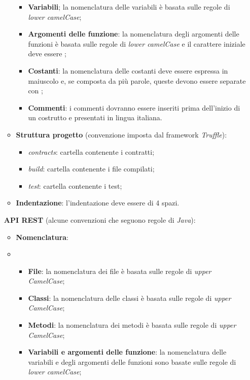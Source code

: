 \begin{itemize}
\begin{itemize}
\begin{itemize}
            \item \textbf{Variabili}; la nomenclatura delle variabili è basata sulle regole di \textit{lower camelCase};
            \item \textbf{Argomenti delle funzione}: la nomenclatura degli argomenti delle funzioni è basata sulle regole di \textit{lower camelCase} e il carattere iniziale deve essere \textit{\textunderscore};
            \item \textbf{Costanti}: la nomenclatura delle costanti deve essere espressa in maiuscolo e, se composta da più parole, queste devono essere separate con \textit{\textunderscore};
            \item \textbf{Commenti}: i commenti dovranno essere inseriti prima dell'inizio di un  costrutto e presentati in lingua italiana.
        \end{itemize}
        \item \textbf{Struttura progetto} (convenzione imposta dal framework \textit{Truffle}):
        \begin{itemize}
            \item \textit{contracts}: cartella contenente i contratti;
            \item \textit{build}: cartella contenente i file compilati;
            \item \textit{test}: cartella contenente i test;
        \end{itemize}
        \item \textbf{Indentazione}: l'indentazione deve essere di 4 spazi.
    \end{itemize}
    \textbf{API REST} (alcune convenzioni che seguono regole di \textit{Java}):
    \begin{itemize}
        \item \textbf{Nomenclatura}:
        \item \begin{itemize}
            \item \textbf{File}: la nomenclatura dei file è basata sulle regole di \textit{upper CamelCase};
            \item \textbf{Classi}: la nomenclatura delle classi è basata sulle regole di \textit{upper CamelCase};
            \item \textbf{Metodi}: la nomenclatura dei metodi è basata sulle regole di \textit{upper CamelCase};
            \item \textbf{Variabili e argomenti delle funzione}: la nomenclatura delle variabili e degli argomenti delle funzioni sono basate sulle regole di \textit{lower camelCase};

\end{itemize}
\end{itemize}
\end{itemize}
